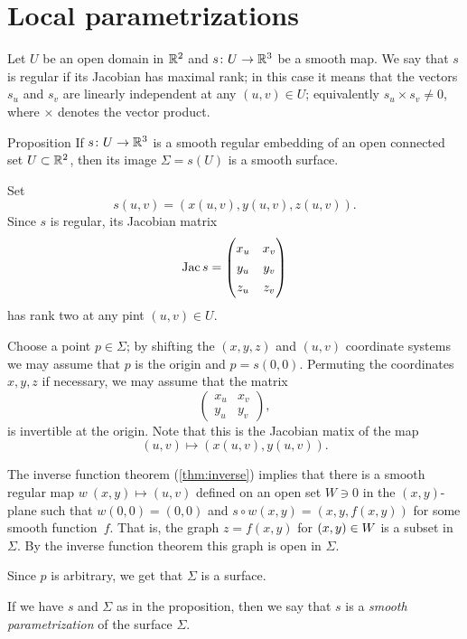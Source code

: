 \section{Local parametrizations}

Let $U$ be an open domain in $\mathbb{R}^2$ and $s\colon U\to \mathbb{R}^3$ be a smooth map.
We say that $s$ is regular if its Jacobian has maximal rank;
in this case it means that the vectors $s_u$ and $s_v$ are linearly independent at any $(u,v)\in U$;
equivalently $s_u\times s_v\ne 0$, where $\times$ denotes the vector product.

\begin{thm}{Proposition}\label{prop:graph-chart}
If $s\colon U\to \mathbb{R}^3$ is a smooth regular embedding of an open connected set $U\subset \mathbb{R}^2$, then its image $\Sigma=s(U)$ is a smooth surface.
\end{thm}

Set 
\[s(u,v)=(x(u,v),y(u,v),z(u,v)).\]
Since $s$ is regular, its Jacobian matrix
\[\Jac s=
\renewcommand\arraystretch{1.3}
\begin{pmatrix}
x_u&x_v\\
y_u&y_v\\
z_u&z_v
\end{pmatrix}
\]
has rank two at any pint $(u,v)\in U$.

Choose a point $p\in \Sigma$; by shifting the $(x,y,z)$ and $(u,v)$ coordinate systems we may assume that $p$ is the origin and $p=s(0,0)$.
Permuting the coordinates $x,y,z$ if necessary, we may assume that 
the matrix 
\[
\renewcommand\arraystretch{1.3}
\begin{pmatrix}
x_u&x_v\\
y_u&y_v
\end{pmatrix},
\] 
is invertible at the origin.
Note that this is the Jacobian matix of the map
\[(u,v)\mapsto (x(u,v),y(u,v)).\]

The inverse function theorem (\ref{thm:inverse}) implies that there is a smooth regular map
$w\:(x,y)\mapsto (u,v)$ defined on an open set $W\ni 0$ in the $(x,y)$-plane
such that $w(0,0)=(0,0)$ and  $s\circ w(x,y)=(x,y,f(x,y))$ for some smooth function~$f$.
That is, the graph $z=f(x,y)$ for $(x,y)\z\in W$ is a subset in $\Sigma$.
By the inverse function theorem this graph is open in $\Sigma$.

Since $p$ is arbitrary, we get that $\Sigma$ is a surface.
\qeds

If we have $s$ and $\Sigma$ as in the proposition, then we say that $s$ is a \emph{smooth parametrization} of the surface $\Sigma$. 

